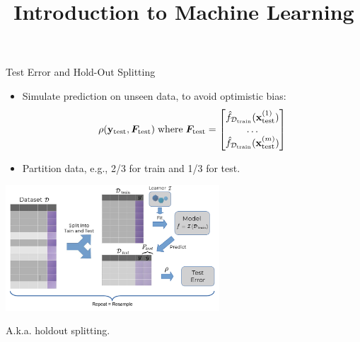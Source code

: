 \documentclass[11pt,compress,t,notes=noshow, xcolor=table]{beamer}
\title{Introduction to Machine Learning}
\institute{\href{https://compstat-lmu.github.io/lecture_i2ml/}{compstat-lmu.github.io/lecture\_i2ml}}
\date{}
\begin{document}
\sloppy


\begin{vbframe}{Test Error and Hold-Out Splitting}

  \small
\begin{itemize}
  \item Simulate prediction on unseen data, to avoid optimistic bias:
\small
$$\rho(\yv_{\mathrm{test}}, \F_{\textrm{test}})\;\text{where}\; 
\F_{\textrm{test}} = \begin{bmatrix} 
\fhDtrain(\xi[1]_{\textrm{test}}) \\ 
\dots \\
\fhDtrain(\xi[m]_{\textrm{test}})
\end{bmatrix}$$ 
  \item Partition data, e.g., 2/3 for train and 1/3 for test.
\end{itemize}

\begin{center}

  \includegraphics[width=0.6\textwidth]{figure_man/test_error.pdf}

\end{center}
A.k.a. holdout splitting.

\end{vbframe}
\end{document}
